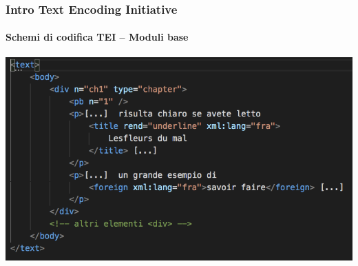 \begin{frame}
	\frametitle{Intro Text Encoding Initiative}
	\framesubtitle{Schemi di codifica TEI – Moduli base}
	\addtocounter{nframe}{1}

	\begin{center}
		\includegraphics[width=.9\textwidth]{imgs/esempio-attr.png}
	\end{center}

\end{frame}


